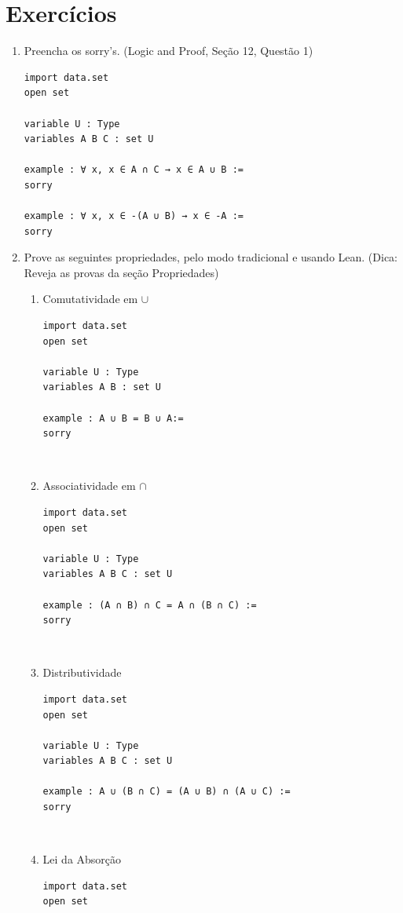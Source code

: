 \section{Exercícios}
\begin{enumerate}

\item Preencha os sorry's. (Logic and Proof, Seção 12, Questão 1)
\begin{lstlisting}
import data.set
open set
  
variable U : Type
variables A B C : set U
  
example : ∀ x, x ∈ A ∩ C → x ∈ A ∪ B :=
sorry
  
example : ∀ x, x ∈ -(A ∪ B) → x ∈ -A :=
sorry
\end{lstlisting}

\item Prove as seguintes propriedades, pelo modo tradicional e usando Lean. (Dica: Reveja as provas da seção Propriedades)

\begin{enumerate}

\item Comutatividade em $\cup$
\begin{lstlisting}
import data.set
open set

variable U : Type
variables A B : set U

example : A ∪ B = B ∪ A:=
sorry\end{lstlisting}

$\qquad$

\item Associatividade em $\cap$
\begin{lstlisting}
import data.set
open set

variable U : Type
variables A B C : set U

example : (A ∩ B) ∩ C = A ∩ (B ∩ C) :=
sorry\end{lstlisting}

$\qquad$

\item Distributividade
\begin{lstlisting}
import data.set
open set

variable U : Type
variables A B C : set U

example : A ∪ (B ∩ C) = (A ∪ B) ∩ (A ∪ C) :=
sorry\end{lstlisting}

$\qquad$

\item Lei da Absorção
\begin{lstlisting}
import data.set
open set


\end{lstlisting}
\end{enumerate}
\end{enumerate}

